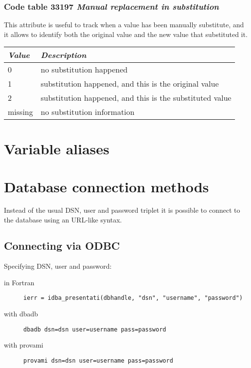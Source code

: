 \documentclass[final,12pt,a4paper,twoside]{book}
\begin{document}
\subsection{Code table 33197 \emph{Manual replacement in substitution}}

This attribute is useful to track when a value has been manually substitute,
and it allows to identify both the original value and the new value that
substituted it.

\begin{tabular}{|l|l|}
\hline
{\em Value} & {\em Description}               \\
\hline
          0 & no substitution happened                                 \\
          1 & substitution happened, and this is the original value    \\
          2 & substitution happened, and this is the substituted value \\
    missing & no substitution information                              \\
\hline
\end{tabular}


\chapter{Variable aliases}

\label{aliastable}


\chapter{Database connection methods}

\label{dburls}

Instead of the usual DSN, user and password triplet it is possible to connect
to the database using an URL-like syntax.

\section{Connecting via ODBC}

Specifying DSN, user and password:

\begin{description}
\item[in Fortran]
  {\tt ierr = idba\_presentati(dbhandle, "dsn", "username", "password")}
\item[with dbadb]
  {\tt dbadb \-\-dsn=dsn \-\-user=username \-\-pass=password}
\item[with provami]
  {\tt provami \-\-dsn=dsn \-\-user=username \-\-pass=password}
\end{description}
\end{document}
